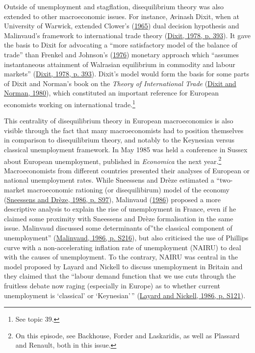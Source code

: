 \documentclass[
  12pt,
  onecolumn]{article}
\begin{document}
Outside of unemployment and stagflation, disequilibrium theory was also
extended to other macroeconomic issues. For instance, Avinash Dixit,
when at University of Warwick, extended Clower's
(\protect\hyperlink{ref-clower1965}{1965}) dual decision hypothesis and
Malinvaud's framework to international trade theory
(\protect\hyperlink{ref-dixit1978}{Dixit, 1978, p. 393}). It gave the
basis to Dixit for advocating a ``more satisfactory model of the balance
of trade'' than Frenkel and Johnson's
(\protect\hyperlink{ref-frenkel1976}{1976}) monetary approach which
``assumes instantaneous attainment of Walrasian equilibrium in commodity
and labour markets'' (\protect\hyperlink{ref-dixit1978}{Dixit, 1978, p.
393}). Dixit's model would form the basis for some parts of Dixit and
Norman's book on the \emph{Theory of International Trade}
(\protect\hyperlink{ref-dixit1980}{Dixit and Norman, 1980}), which
constituted an important reference for European economists working on
international trade.\footnote{See topic 39.}

This centrality of disequilibrium theory in European macroeconomics is
also visible through the fact that many macroeconomists had to position
themselves in comparison to disequilibrium theory, and notably to the
Keynesian versus classical unemployment framework. In May 1985 was held
a conference in Sussex about European unemployment, published in
\emph{Economica} the next year.\footnote{On this episode, see Backhouse,
  Forder and Laskaridis, as well as Plassard and Renault, both in this
  issue.} Macroeconomists from different countries presented their
analyses of European or national unemployment rates. While Sneessens and
Drèze estimated a ``two-market macroeconomic rationing (or
disequilibirum) model of the economy
(\protect\hyperlink{ref-sneessens1986}{Sneessens and Drèze, 1986, p.
S97}), Malinvaud (\protect\hyperlink{ref-malinvaud1986}{1986}) proposed
a more descriptive analysis to explain the rise of unemployment in
France, even if he claimed some proximity with Sneessens and Drèze
formalisation in the same issue. Malinvaud discussed some determinants
of''the classical component of unemployment''
(\protect\hyperlink{ref-malinvaud1986}{Malinvaud, 1986, p. S216}), but
also criticised the use of Phillips curve with a non-accelerating
inflation rate of unemployment (NAIRU) to deal with the causes of
unemployment. To the contrary, NAIRU was central in the model proposed
by Layard and Nickell to discuss unemployment in Britain and they
claimed that the ``labour demand function that we use cuts through the
fruitless debate now raging (especially in Europe) as to whether current
unemployment is `classical' or `Keynesian'\,''
(\protect\hyperlink{ref-layard1986}{Layard and Nickell, 1986, p. S121}).
\end{document}
